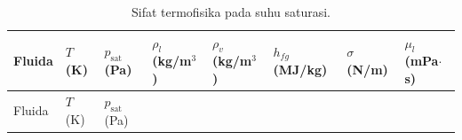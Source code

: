\documentclass[
  indonesian,
  12pt,
  a4paper,
]{report}
\begin{document}
\begin{longtable}[]{@{}
  >{\raggedright\arraybackslash}p{}
  >{\raggedleft\arraybackslash}p{}
  >{\raggedleft\arraybackslash}p{}
  >{\raggedleft\arraybackslash}p{}
  >{\raggedleft\arraybackslash}p{}
  >{\raggedleft\arraybackslash}p{}
  >{\raggedleft\arraybackslash}p{}
  >{\raggedleft\arraybackslash}p{}@{}}
\caption{Sifat termofisika pada suhu
saturasi.}\label{tbl-props}\tabularnewline
\toprule\noalign{}
\begin{minipage}[b]{\linewidth}\raggedright
Fluida
\end{minipage} & \begin{minipage}[b]{\linewidth}\raggedleft
\(T\) (K)
\end{minipage} & \begin{minipage}[b]{\linewidth}\raggedleft
\(p_{\mathrm{sat}}\) (Pa)
\end{minipage} & \begin{minipage}[b]{\linewidth}\raggedleft
\(\rho_l\) (kg/m\(^3\))
\end{minipage} & \begin{minipage}[b]{\linewidth}\raggedleft
\(\rho_v\) (kg/m\(^3\))
\end{minipage} & \begin{minipage}[b]{\linewidth}\raggedleft
\(h_{fg}\) (MJ/kg)
\end{minipage} & \begin{minipage}[b]{\linewidth}\raggedleft
\(\sigma\) (N/m)
\end{minipage} & \begin{minipage}[b]{\linewidth}\raggedleft
\(\mu_l\) (mPa\(\cdot\)s)
\end{minipage} \\
\midrule\noalign{}
\endfirsthead
\toprule\noalign{}
\begin{minipage}[b]{\linewidth}\raggedright
Fluida
\end{minipage} & \begin{minipage}[b]{\linewidth}\raggedleft
\(T\) (K)
\end{minipage} & \begin{minipage}[b]{\linewidth}\raggedleft
\(p_{\mathrm{sat}}\) (Pa)
\end{minipage} & \begin{minipage}[b]{\linewidth}\raggedleft

\end{minipage}
\end{longtable}
\end{document}
